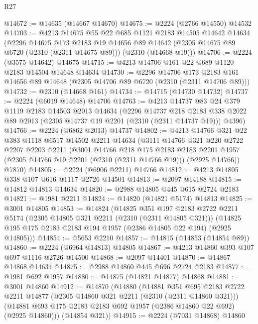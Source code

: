 \begin{lexlean}{R27}
\begin{coremodule}
@14672 := @14635 (@14667 @14670)
@14675 := @2224 (@2766 @14550) @14532
@14703 := @4213
    @14675
    @55
    @22
    @685
    @1121
    @2183
    @14505
    @14642
    @14634
    (@2296
      @14675
      @173
      @2183
      @19
      @14656
      @89
      @14642
      (@2305 @14675 @89 @6720 (@2310 (@2311 @14675 @89)))
      (@2310 (@14668 @19)))
@14706 := @2224 (@3575 @14642) @14675
@14715 := @4213 @14706 @161 @22 @689 @1120 @2183 @14504 @14648 @14634
@14730 := @2296
    @14706
    @173
    @2183
    @161
    @14656
    @89
    @14648
    (@2305 @14706 @89 @6720 (@2310 (@2311 @14706 @89)))
@14732 := @2310 (@14668 @161)
@14734 := @14715 (@14730 @14732)
@14737 := @2224 (@6019 @14648) @14706
@14763 := @4213
    @14737
    @83
    @24
    @379
    @1119
    @2183
    @14503
    @2013
    @14634
    (@2296
      @14737
      @218
      @2183
      @338
      @2022
      @89
      @2013
      (@2305 @14737 @19 @2201 (@2310 (@2311 @14737 @19)))
      @4396)
@14766 := @2224 (@6862 @2013) @14737
@14802 := @4213
    @14766
    @321
    @22
    @383
    @1118
    @6517
    @14502
    @2211
    @14634
    (@3111
      @14766
      @321
      @220
      @2722
      @2207
      @2203
      @2211
      (@3001
        @14766
        @218
        @175
        @2183
        @2183
        @2201
        @1957
        (@2305 @14766 @19 @2201 (@2310 (@2311 @14766 @19)))
        (@2925 @14766))
      @7870)
@14805 := @2224 (@6906 @2211) @14766
@14812 := @4213 @14805 @338 @107 @616 @1117 @2726 @14501
@14813 := @2097 @14188
@14815 := @14812 @14813 @14634
@14820 := @2988 @14805 @445 @615 @2724 @2183
@14821 := @1981 @2211
@14824 := @14820 (@14821 @5174) @14813
@14825 := @3001 @14805
@14853 := @14824
    (@14825
      @351
      @197
      @2183
      @2722
      @2211
      @5174
      (@2305 @14805 @321 @2211 (@2310 (@2311 @14805 @321)))
      (@14825 @195 @175 @2183 @2183 @194 @1957 (@2386 @14805 @22 @194) (@2925 @14805)))
@14854 := @5653 @2210
@14857 := @14815 (@14853 (@14854 @89))
@14860 := @2224 (@6964 @14813) @14805
@14867 := @4213 @14860 @393 @107 @697 @1116 @2726 @14500
@14868 := @2097 @14401
@14870 := @14867 @14868 @14634
@14875 := @2988 @14860 @445 @696 @2724 @2183
@14877 := @1981 @692 @1957
@14880 := @14875 (@14821 @14877) @14868
@14881 := @3001 @14860
@14912 := @14870
    (@14880
      (@14881
        @351
        @695
        @2183
        @2722
        @2211
        @14877
        (@2305 @14860 @321 @2211 (@2310 (@2311 @14860 @321)))
        (@14881 @693 @175 @2183 @2183 @692 @1957 (@2386 @14860 @22 @692) (@2925 @14860)))
      (@14854 @321))
@14915 := @2224 (@7031 @14868) @14860

\end{coremodule}
\end{lexlean}
